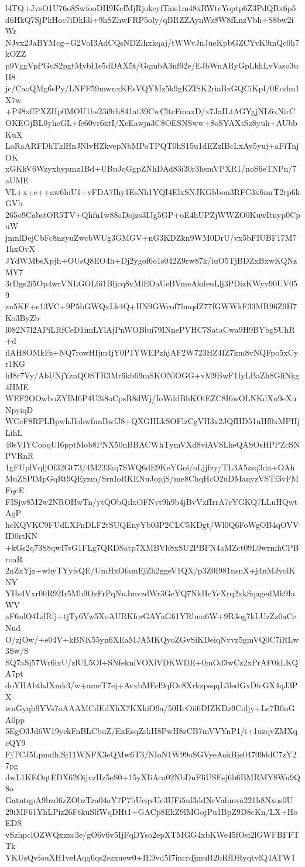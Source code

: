 l4TQ+JvsO1U76o8SwfooDH9KcfMjRjokcyfTais1m48xRWteYoptp6Z3PdQBx6p5
d6HkQ7SjPkHoc7iDkI3i+9hSZhwFRP5oly/qBRZZAynWz8W8fLnzVbh+S8bw2iWr
NJvx2JaBYMcg+G2VoI3AdCQsNDZlhxkqaj/tWWvJnJueKpbGZCYvK9mQc0h7kOZZ
p9VggVpPGuS2pgtMybI1e5dDAX5t/GqmbA3nf92e/EJbWnARyGpLkhLyVaso3uH8
jc/CaoQMg6sPy/LNFF59mwnxKEsVQYMz5k9gKZISK2riaBxGQCiKpI/0Eodm1X7w
+P48xffPXZHp0MOU1bs23i9rh841at39CwCltcFmaxD/x7JaILtAGYgjNL6xNirC
OKEGjBL0yhcGL+fe60vr6xtI/XcEawjn3C8OESNSww+8oSYAXtSz8yuh+AUbbKuX
LoRaARFDhTklHnJNlvHZkvepNbMPoTPQT0hS15u1dEZzIBcLxAy5yuj+aFiTnjOK
xGKkV6Wzyxhypmz1Bd+UBuJqGgpZNhDAd83i30r3hsmVPXR1/noS6eTNPn/7aUME
VL+x+e++aw6hiU1+vFDA7Ihy1EsNh1YQI4ElxSNJKGbbon3RFC3x6mrT2rp6kGVb
265o9CabstOR5TV+Qhfu1w88aDojzs3IJg5GP+oE4hUPZjWWZO0KuwItnyp0CpuW
jmnlDejCbFc8nzyuZwcbWUg3GMGV+nG3KDZkn9WM0DrU/vx5bFIUBF17M71hxOvX
JYdWMbsXpjh+OUsQ8EO4h+Dj2ygof6o1s042Z9rw87k/iuO5TjBDZxBxwKQNzMY7
3rDgs2i5Op4wrVNLGOL6i1Bljcq8vMlEOaUeBVmeAkdeuLlj3PDizKWyv90UV059
zn5KE+e13VC+9P5bGWQxLk4Q+HN9GWcof7lmqdZ77fGWWkF33MR96Z9H7Ko3ByZb
l082N7l2APiLRfCeD1imLYlAjPnWOBlui79INnePVHC7SataCwa9H9BYbgSUhR+d
ilAH8OMkFz+NQ7rowHIjm4jY0P1YWEPzhjAF2W723HZ4IZ7km8vNQFpo5xCyr1KG
hI8r7Vy/AbUNjYznQOSTR3Mr6kb69mSKONlOGG+vM9BwF1IyLBaZh8GliNkg4HME
WEF2OOwboZYIM6P4U3i8oCpsR8dWj/IoWddBhKOiEZC8I6wOLNKdXn9eXuNpyiqD
WCcF8RPLBpwhJlohwfnnBwfJ8+QXGHLkSOFlzCgVH3x2JQfHD51uHf0xMPHjLihL
40sVIYCooqUI6pptMob8PNX50nBBACWhTymVXd8viAVSLkeQASOsHPPZcSNPVRnR
1gFUplVqljOf32Gt73/4M233kq7SWQ6dE9KeYGoi/oLjjfzy/TL3A5zsq3da+OAh
MuZSPlMpGqRt9QEyzm/SrnIoRKENuJopjS/me8ChqHcO2uDManyzVSTf3vFMFqcE
FISjw8M2w2NROHwTn/ytQObQilxOFNvt9h9b4jBvVxfIrrA7rYGKQ7LLuHQwtAgP
hcKQVKC9FUdLXFnDLF2tSUQEnyYb03P2CLC5KDgt/Wl0Q6FoWgOB4qOVVID0rtKN
+kGs2q73S8qwI7sG1FLg7QRDSatp7XMBVh8xSU2PBFN4aMZct09L9wrmhCPBroaR
2nZxYjz+whyTYyfsQE/UmHxOfamEjZh2ggeV1QX/p3Z0I981nsnX+j4nMJyolKNY
YHs4Vxr00R92Ir5Mb9OzFrPqNuJmvzdWr3GeYQ7NkHcYcXrq2xkSqagedMk9IaWV
aF6nlO4LdRfj+tjTy6Vw5XoAURKforGAYuG61YRbua6W+9R3og7kLUzZz0aCeNud
O/zjOw/+e04V+kBNK55yn6XEaMJAMKQyoZGvSiKDeiqNvvz5gmVQ0C7iRLw3Sw/S
SQ7aSj57Wr6ixU/zlUL5Ol+SNfekniVOXlVDKWDE+0mOd3wCz2xPrAF0kLKQA7pt
doYHAbtbJXmk3/w+ameT7ej+AvxbMFeI9qfOc8XrkzpsqqL3ledGxDfcGX4qJ3PX
wnGyqb9YVs7oAAAMCdEdXhX7KXkiO9a/50HcOii6DIZKDz9Coljy+Lc7B0nGA0pp
5EgO3Jd6W19yckFnBLCbuZ/ExEsqZskH8PwH8zCB7mVVYnP1/i+1uzqvZMXqcQY9
FjTCJ5LpmdhlSj11WNFX3eQMw6T3/NIoN1W99oSGVyeAokBje04709ddC7zY27pg
dwL1KEOqtEDX62OijvzHz5eS0+15yXIiAca02NbDuFliUSEsj6b6BMRMY8Wu9Q8o
GatntqpA9bzd6zZObzTza04aY7P7bUeqvUc3UFi5ul3ddNrVahmva221b8Nxos0U
29iMF61YhLPiz26FtkuSlfWqDHt1+GACp8EkZ9lMGojPu1BpZ9D8cKn/LX+HoEDS
vSzhpclOZWQxzxc3e/gO6v6v5IjFqDYso2epXTMGG4xbKWe45fOsi2lGWFBFFTTk
YKUsQvfouXH1veIAqq6qs2ezxuew0+IE9vd5I7incrdjmuR2bRfDRyqtvlQ4ATW1
